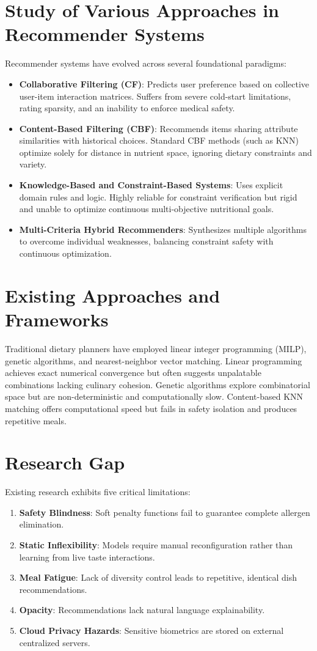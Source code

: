 \documentclass[12pt,a4paper]{report}
\begin{document}
\section{Study of Various Approaches in Recommender Systems}
Recommender systems have evolved across several foundational paradigms:
\begin{itemize}
    \item \textbf{Collaborative Filtering (CF)}: Predicts user preference based on collective user-item interaction matrices. Suffers from severe cold-start limitations, rating sparsity, and an inability to enforce medical safety.
    \item \textbf{Content-Based Filtering (CBF)}: Recommends items sharing attribute similarities with historical choices. Standard CBF methods (such as KNN) optimize solely for distance in nutrient space, ignoring dietary constraints and variety.
    \item \textbf{Knowledge-Based and Constraint-Based Systems}: Uses explicit domain rules and logic. Highly reliable for constraint verification but rigid and unable to optimize continuous multi-objective nutritional goals.
    \item \textbf{Multi-Criteria Hybrid Recommenders}: Synthesizes multiple algorithms to overcome individual weaknesses, balancing constraint safety with continuous optimization.
\end{itemize}

\section{Existing Approaches and Frameworks}
Traditional dietary planners have employed linear integer programming (MILP), genetic algorithms, and nearest-neighbor vector matching. Linear programming achieves exact numerical convergence but often suggests unpalatable combinations lacking culinary cohesion. Genetic algorithms explore combinatorial space but are non-deterministic and computationally slow. Content-based KNN matching offers computational speed but fails in safety isolation and produces repetitive meals.

\section{Research Gap}
Existing research exhibits five critical limitations:
\begin{enumerate}
    \item \textbf{Safety Blindness}: Soft penalty functions fail to guarantee complete allergen elimination.
    \item \textbf{Static Inflexibility}: Models require manual reconfiguration rather than learning from live taste interactions.
    \item \textbf{Meal Fatigue}: Lack of diversity control leads to repetitive, identical dish recommendations.
    \item \textbf{Opacity}: Recommendations lack natural language explainability.
    \item \textbf{Cloud Privacy Hazards}: Sensitive biometrics are stored on external centralized servers.
\end{enumerate}
\end{document}
